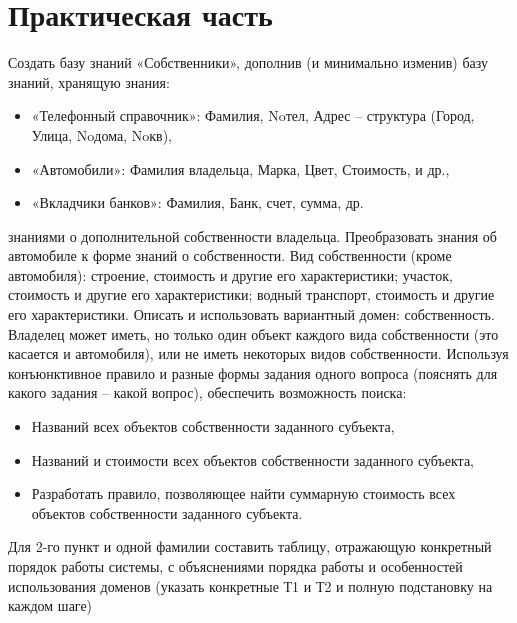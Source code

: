 \setcounter{page}{3}

\chapter{Практическая часть}
Создать базу знаний «Собственники», дополнив (и минимально изменив) базу
знаний, хранящую знания:
\begin{itemize}
	\item «Телефонный справочник»: Фамилия, Noтел, Адрес – структура (Город, Улица, Noдома, Noкв),
	\item «Автомобили»: Фамилия владельца, Марка, Цвет, Стоимость, и др.,
	\item «Вкладчики банков»: Фамилия, Банк, счет, сумма, др.
\end{itemize}
знаниями о дополнительной собственности владельца. Преобразовать знания об автомобиле к форме знаний о собственности.
Вид собственности (кроме автомобиля): строение, стоимость и другие его характеристики; участок, стоимость и другие его характеристики; водный транспорт, стоимость и другие его характеристики.
Описать и использовать вариантный домен: собственность. Владелец может иметь, но только один объект каждого вида собственности (это касается и автомобиля), или не иметь некоторых видов собственности.
Используя конъюнктивное правило и разные формы задания одного вопроса (пояснять для какого задания – какой вопрос), обеспечить возможность поиска:
\begin{itemize}
	\item Названий всех объектов собственности заданного субъекта,
	\item Названий и стоимости всех объектов собственности заданного субъекта,
	\item Разработать правило, позволяющее найти суммарную стоимость всех объектов собственности заданного субъекта.
\end{itemize}

Для 2-го пункт и одной фамилии составить таблицу, отражающую конкретный порядок работы системы, с объяснениями порядка работы и особенностей использования доменов (указать конкретные Т1 и Т2 и полную подстановку на каждом шаге)
  
